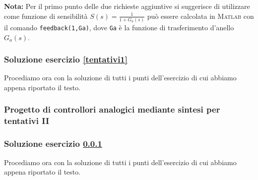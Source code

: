 \documentclass[../main.tex]{subfiles}
\begin{document}
\textbf{Nota:} Per il primo punto delle due richieste aggiuntive si suggerisce di utilizzare come funzione di sensibilità $S(s) = \frac{1}{1 + G_a(s)}$ può essere calcolata in \textsc{Matlab} con il comando \texttt{feedback(1,Ga)}, dove \texttt{Ga} è la funzione di trasferimento d’anello $G_a(s)$.\\

\subsubsection*{Soluzione esercizio \ref{tentativi1}}

Procediamo ora con la soluzione di tutti i punti dell'esercizio di cui abbiamo appena riportato il testo.




\vspace*{1cm}
\subsubsection{Progetto di controllori analogici mediante sintesi per tentativi II}
\label{tentativi2}


\subsubsection*{Soluzione esercizio \ref{tentativi2}}

Procediamo ora con la soluzione di tutti i punti dell'esercizio di cui abbiamo appena riportato il testo.
\end{document}

